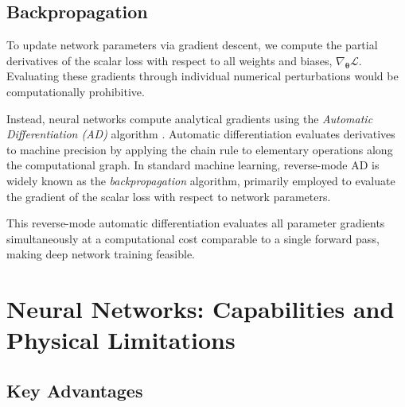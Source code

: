 \subsection{Backpropagation}
\label{subsec:backpropagation}

To update network parameters via gradient descent,
we compute the partial derivatives of the scalar loss with respect to all weights and biases, $\nabla_{\boldsymbol{\theta}} \mathcal{L}$.
Evaluating these gradients through individual numerical perturbations would be computationally prohibitive.

Instead, neural networks compute analytical gradients using the \textit{Automatic Differentiation (AD)} algorithm \cite{baydin2018automatic}.
Automatic differentiation evaluates derivatives to machine precision by applying the chain rule to elementary operations along the computational graph.
In standard machine learning, reverse-mode AD is widely known as the \textit{backpropagation} algorithm, primarily employed to evaluate the gradient of the scalar loss with respect to network parameters.

This reverse-mode automatic differentiation evaluates all parameter gradients simultaneously
at a computational cost comparable to a single forward pass,
making deep network training feasible.

\section{Neural Networks: Capabilities and Physical Limitations}
\label{sec:why_neural_networks}

\subsection{Key Advantages}
\label{subsec:capabilities_universal}

